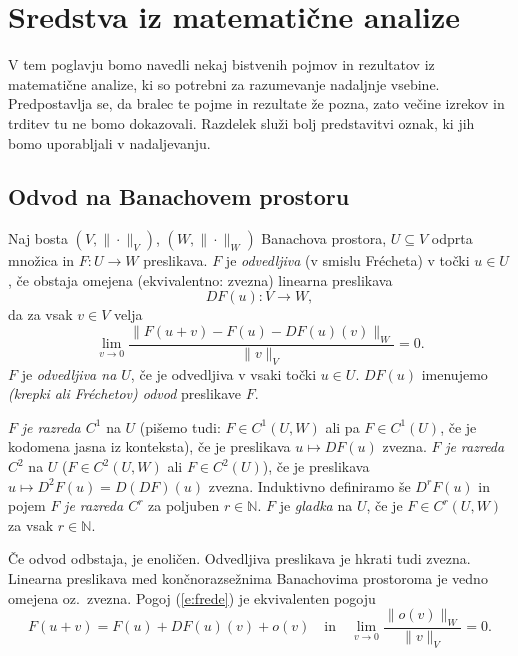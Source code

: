 \chapter{Sredstva iz matematične analize}


V tem poglavju bomo navedli nekaj bistvenih pojmov in rezultatov iz matematične analize,
ki so potrebni za razumevanje nadaljnje vsebine. Predpostavlja
se, da bralec te pojme in rezultate že pozna, zato večine izrekov in trditev
tu ne bomo dokazovali. Razdelek služi bolj predstavitvi oznak, ki jih
bomo uporabljali v nadaljevanju.


\section{Odvod na Banachovem prostoru}


\begin{definicija} \label{def:odvod}
	Naj bosta $(V,\|\cdot\|_V)$, $(W,\|\cdot\|_W)$ Banachova prostora, $U\subseteq V$ odprta
	množica in $F\colon U\to W$ preslikava. $F$ je \emph{odvedljiva}
	(v smislu Frécheta) v točki $u\in U$, če obstaja omejena (ekvivalentno: zvezna) linearna preslikava
	\[ DF(u)\colon V\to W, \]
	da za vsak $v\in V$ velja
	\begin{equation} \label{e:frede}
		\lim_{v\to 0}\frac{\|F(u+v)-F(u)-DF(u)(v)\|_W}{\|v\|_V}=0.
	\end{equation}
	$F$ je \emph{odvedljiva na $U$}, če je odvedljiva v vsaki točki $u\in U$.
	$DF(u)$ imenujemo \emph{(krepki ali Fréchetov) odvod} preslikave $F$.
	
	$F$ \emph{je razreda $C^1$} na $U$ (pišemo tudi: $F\in C^1(U,W)$ ali pa $F\in C^1(U)$,
	če je kodomena jasna iz konteksta), če je preslikava $u\mapsto DF(u)$ zvezna.
	$F$ \emph{je razreda $C^2$} na $U$ ($F\in C^2(U,W)$ ali $F\in C^2(U)$),
	če je preslikava $u\mapsto D^2F(u)=D(DF)(u)$ zvezna. Induktivno definiramo še $D^rF(u)$ in pojem
	$F$ \emph{je razreda $C^r$} za poljuben $r\in\mathbb{N}$. $F$ je \emph{gladka} na $U$,
	če je $F\in C^r(U,W)$ za vsak $r\in\mathbb{N}$.
\end{definicija}

Če odvod odbstaja, je enoličen. Odvedljiva preslikava je hkrati tudi zvezna.
Linearna preslikava med končnorazsežnima Banachovima prostoroma je vedno omejena
oz.~zvezna. Pogoj (\ref{e:frede}) je ekvivalenten pogoju
\begin{equation*} %
	F(u+v)=F(u)+DF(u)(v)+o(v)\quad\textrm{in}\quad
	\lim_{v\to 0}\frac{\|o(v)\|_W}{\|v\|_V}=0.
\end{equation*}


